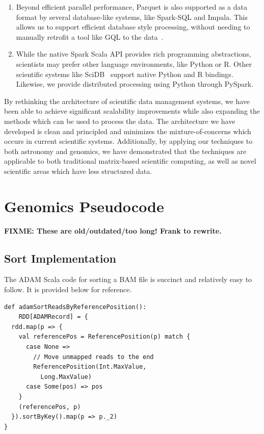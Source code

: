 \documentclass{acm_proc_article-sp}
\begin{document}
\begin{enumerate}
\item Beyond efficient parallel performance, Parquet is also supported as a data format by several
database-like systems, like Spark-SQL and Impala. This allows us to support efficient database style
processing, without needing to manually retrofit a tool like GQL to the data~\cite{kozanitis14}.
\item While the native Spark Scala API provides rich programming abstractions, scientists may prefer
other language environments, like Python or R. Other scientific systems like SciDB~\cite{brown10}
support native Python and R bindings. Likewise, we provide distributed processing using Python
through PySpark.
\end{enumerate}

By rethinking the architecture of scientific data management systems, we have been able to achieve
significant scalability improvements while also expanding the methods which can be used to process
the data. The architecture we have developed is clean and principled and minimizes the
mixture-of-concerns which occurs in current scientific systems. Additionally, by applying our techniques
to both astronomy and genomics, we have demonstrated that the techniques are applicable to both
traditional matrix-based scientific computing, as well as novel scientific areas which have less structured
data.

\clearpage

\appendix


 

\section{Genomics Pseudocode}
\label{sec:genomics-pseudocode}

\textbf{FIXME: These are old/outdated/too long! Frank to rewrite.}

\subsection{Sort Implementation}
\label{sec:sort-implementation}

The ADAM Scala code for sorting a BAM file is succinct and relatively 
easy to follow. It is provided below for reference.

\begin{lstlisting}
def adamSortReadsByReferencePosition():
    RDD[ADAMRecord] = {
  rdd.map(p => {
    val referencePos = ReferencePosition(p) match {
      case None =>
        // Move unmapped reads to the end
        ReferencePosition(Int.MaxValue,
          Long.MaxValue)
      case Some(pos) => pos
    }
    (referencePos, p)
  }).sortByKey().map(p => p._2)
}
\end{lstlisting}
\end{document}
